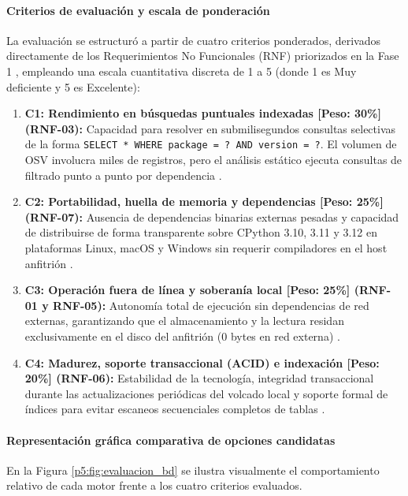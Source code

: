 \paragraph*{Criterios de evaluación y escala de ponderación}
La evaluación se estructuró a partir de cuatro criterios ponderados, derivados directamente de los Requerimientos No Funcionales (RNF) priorizados en la Fase 1 \cite{wiegers2013software, iso2011sqa}, empleando una escala cuantitativa discreta de 1 a 5 (donde 1 es Muy deficiente y 5 es Excelente):

\begin{enumerate}
    \item \textbf{C1: Rendimiento en búsquedas puntuales indexadas [Peso: 30\%] (RNF-03):} Capacidad para resolver en submilisegundos consultas selectivas de la forma \texttt{SELECT * WHERE package = ? AND version = ?}. El volumen de OSV involucra miles de registros, pero el análisis estático ejecuta consultas de filtrado punto a punto por dependencia \cite{openssf2023osv}.
    \item \textbf{C2: Portabilidad, huella de memoria y dependencias [Peso: 25\%] (RNF-07):} Ausencia de dependencias binarias externas pesadas y capacidad de distribuirse de forma transparente sobre CPython 3.10, 3.11 y 3.12 en plataformas Linux, macOS y Windows sin requerir compiladores en el host anfitrión \cite{pressman2020software}.
    \item \textbf{C3: Operación fuera de línea y soberanía local [Peso: 25\%] (RNF-01 y RNF-05):} Autonomía total de ejecución sin dependencias de red externas, garantizando que el almacenamiento y la lectura residan exclusivamente en el disco del anfitrión (0 bytes en red externa) \cite{ladisa2023sok, gutierrez2024auditoria}.
    \item \textbf{C4: Madurez, soporte transaccional (ACID) e indexación [Peso: 20\%] (RNF-06):} Estabilidad de la tecnología, integridad transaccional durante las actualizaciones periódicas del volcado local y soporte formal de índices para evitar escaneos secuenciales completos de tablas \cite{sommerville2016software}.
\end{enumerate}

\paragraph*{Representación gráfica comparativa de opciones candidatas}
En la Figura \ref{p5:fig:evaluacion_bd} se ilustra visualmente el comportamiento relativo de cada motor frente a los cuatro criterios evaluados.

